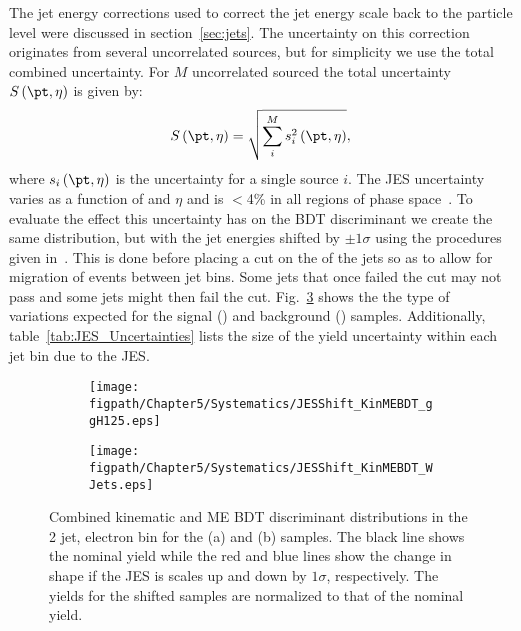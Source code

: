 The jet energy corrections used to correct the jet energy scale back to the particle level were discussed in section~\ref{sec:jets}.
The uncertainty on this correction originates from several uncorrelated sources, but for simplicity we use the total combined uncertainty.
For $M$ uncorrelated sourced the total uncertainty $S\left(\pt,\eta\right)$ is given by:
\begin{equation}
  S\left(\pt,\eta\right)=\sqrt{\sum_{i}^{M}s_{i}^{2}\left(\pt,\eta\right)},
\end{equation}
where $s_{i}\left(\pt,\eta\right)$ is the uncertainty for a single source $i$.
The JES uncertainty varies as a function of \pt and $\eta$ and is $<$4\% in all regions of phase space~\cite{Khachatryan:2198719}.
To evaluate the effect this uncertainty has on the BDT discriminant we create the same distribution, but with the jet energies shifted by $\pm1\sigma$ using the procedures given in~\cite{JECUncertainties,JECUncertaintySources}.
This is done before placing a cut on the \pt of the jets so as to allow for migration of events between jet bins.
Some jets that once failed the \pt cut may not pass and some jets might then fail the \pt cut.
Fig.~\ref{fig:JESShift_KinMEBDT} shows the the type of variations expected for the signal (\ggH) and background (\Wjets) samples.
Additionally, table~\ref{tab:JES_Uncertainties} lists the size of the yield uncertainty within each jet bin due to the JES.

\begin{figure}[!hbt]
    \centering
    \begin{subfigure}[t]{0.48\textwidth}
        \texttt{[image: \\figpath/Chapter5/Systematics/JESShift\_KinMEBDT\_ggH125.eps]}
        \caption{}
        \label{fig:JESShift_KinMEBDT_ggH125}
    \end{subfigure}
    \begin{subfigure}[t]{0.48\textwidth}
        \texttt{[image: \\figpath/Chapter5/Systematics/JESShift\_KinMEBDT\_WJets.eps]}
        \caption{}
        \label{fig:JESShift_KinMEBDT_WJets}
    \end{subfigure}
    \caption{Combined kinematic and ME BDT discriminant distributions in the 2 jet, electron bin for the (a) \ggH and (b) \Wjets samples. The black line shows the nominal yield while the red and blue lines show the change in shape if the JES is scales up and down by $1\sigma$, respectively. The yields for the shifted samples are normalized to that of the nominal yield.}
    \label{fig:JESShift_KinMEBDT}
\end{figure}

